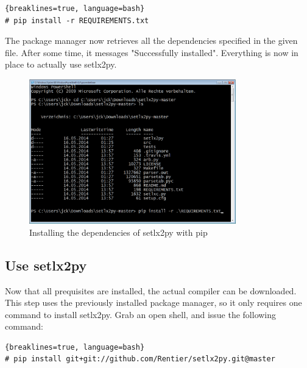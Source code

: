 \begin{lstlisting}{breaklines=true, language=bash}
# pip install -r REQUIREMENTS.txt
\end{lstlisting}

The package manager now retrieves all the dependencies specified in the given file. After some time, it messages "Successfully installed". Everything is now in place to actually use setlx2py.

\begin{figure}[ht]
    \centering
    \includegraphics[width=0.8\textwidth]{img/install-reqs.png}
    \caption{Installing the dependencies of setlx2py with pip}
    \label{fig:install-req}
\end{figure}

\subsection{Use setlx2py}

Now that all prequisites are installed, the actual compiler can be downloaded. This step uses the previously installed package manager, so it only requires one command to install setlx2py. Grab an open shell, and issue the following command:

\begin{lstlisting}{breaklines=true, language=bash}
# pip install git+git://github.com/Rentier/setlx2py.git@master
\end{lstlisting}